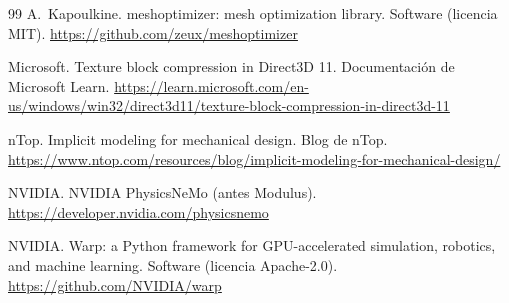 \begin{thebibliography}{99}
A.~Kapoulkine.
\newblock meshoptimizer: mesh optimization library.
\newblock Software (licencia MIT).
\newblock \url{https://github.com/zeux/meshoptimizer}

Microsoft.
\newblock Texture block compression in Direct3D 11. Documentación de Microsoft Learn.
\newblock \url{https://learn.microsoft.com/en-us/windows/win32/direct3d11/texture-block-compression-in-direct3d-11}

nTop.
\newblock Implicit modeling for mechanical design. Blog de nTop.
\newblock \url{https://www.ntop.com/resources/blog/implicit-modeling-for-mechanical-design/}

NVIDIA.
\newblock NVIDIA PhysicsNeMo (antes Modulus).
\newblock \url{https://developer.nvidia.com/physicsnemo}

NVIDIA.
\newblock Warp: a Python framework for GPU-accelerated simulation, robotics, and machine learning.
\newblock Software (licencia Apache-2.0).
\newblock \url{https://github.com/NVIDIA/warp}

\end{thebibliography}
